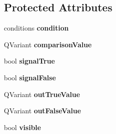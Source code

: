 \subsection*{Protected Attributes}
\begin{DoxyCompactItemize}
\item 
\hypertarget{classQELink_a13e17b9b474855b6e62789823e0b6ff0}{
conditions {\bfseries condition}}
\label{classQELink_a13e17b9b474855b6e62789823e0b6ff0}

\item 
\hypertarget{classQELink_a2284b564d555349cdde33a26f22a6b00}{
QVariant {\bfseries comparisonValue}}
\label{classQELink_a2284b564d555349cdde33a26f22a6b00}

\item 
\hypertarget{classQELink_aa6dfff5a2a6161cd3e71aa35524a41ad}{
bool {\bfseries signalTrue}}
\label{classQELink_aa6dfff5a2a6161cd3e71aa35524a41ad}

\item 
\hypertarget{classQELink_adface5dcb4029e7fa9c598e6a99ec9a0}{
bool {\bfseries signalFalse}}
\label{classQELink_adface5dcb4029e7fa9c598e6a99ec9a0}

\item 
\hypertarget{classQELink_a02dc407e1f9cbea2e819729b48539c04}{
QVariant {\bfseries outTrueValue}}
\label{classQELink_a02dc407e1f9cbea2e819729b48539c04}

\item 
\hypertarget{classQELink_aa08948f9296695ec066a993f19dedd80}{
QVariant {\bfseries outFalseValue}}
\label{classQELink_aa08948f9296695ec066a993f19dedd80}

\item 
\hypertarget{classQELink_a299abea79c3855a94d743e3540921a92}{
bool {\bfseries visible}}
\label{classQELink_a299abea79c3855a94d743e3540921a92}

\end{DoxyCompactItemize}
